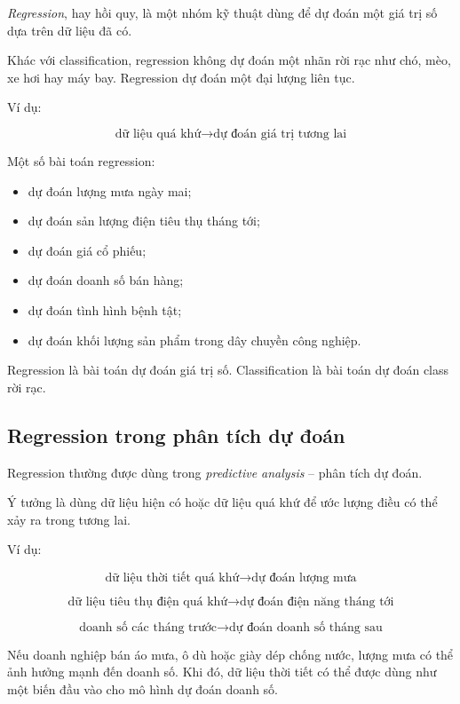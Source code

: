 \textit{Regression}, hay hồi quy, là một nhóm kỹ thuật dùng để dự đoán một giá trị số dựa trên dữ liệu đã có.

Khác với classification, regression không dự đoán một nhãn rời rạc như chó, mèo, xe hơi hay máy bay. Regression dự đoán một đại lượng liên tục.

Ví dụ:

\[
    \text{dữ liệu quá khứ}
    \rightarrow
    \text{dự đoán giá trị tương lai}
\]

Một số bài toán regression:

\begin{itemize}
    \item dự đoán lượng mưa ngày mai;
    \item dự đoán sản lượng điện tiêu thụ tháng tới;
    \item dự đoán giá cổ phiếu;
    \item dự đoán doanh số bán hàng;
    \item dự đoán tình hình bệnh tật;
    \item dự đoán khối lượng sản phẩm trong dây chuyền công nghiệp.
\end{itemize}

\begin{ghinho}
Regression là bài toán dự đoán giá trị số. Classification là bài toán dự đoán class rời rạc.
\end{ghinho}

\subsection{Regression trong phân tích dự đoán}

Regression thường được dùng trong \textit{predictive analysis} -- phân tích dự đoán.

Ý tưởng là dùng dữ liệu hiện có hoặc dữ liệu quá khứ để ước lượng điều có thể xảy ra trong tương lai.

Ví dụ:

\[
    \text{dữ liệu thời tiết quá khứ}
    \rightarrow
    \text{dự đoán lượng mưa}
\]

\[
    \text{dữ liệu tiêu thụ điện quá khứ}
    \rightarrow
    \text{dự đoán điện năng tháng tới}
\]

\[
    \text{doanh số các tháng trước}
    \rightarrow
    \text{dự đoán doanh số tháng sau}
\]

\begin{vidu}
Nếu doanh nghiệp bán áo mưa, ô dù hoặc giày dép chống nước, lượng mưa có thể ảnh hưởng mạnh đến doanh số. Khi đó, dữ liệu thời tiết có thể được dùng như một biến đầu vào cho mô hình dự đoán doanh số.
\end{vidu}

